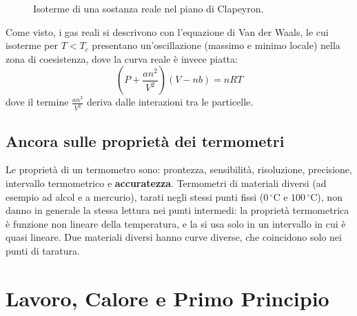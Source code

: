 \documentclass[11pt, a4paper, openright]{book}
\theoremstyle{plain}
\theoremstyle{definition}
\theoremstyle{remark}
\begin{document}
\begin{figure}[H]
    \centering
    \caption{Isoterme di una sostanza reale nel piano di Clapeyron.}
\end{figure}

Come visto, i gas reali si descrivono con l'equazione di Van der Waals, le cui isoterme per $T < T_c$ presentano un'oscillazione (massimo e minimo locale) nella zona di coesistenza, dove la curva reale è invece piatta:
\begin{equation}
    \left(P + \frac{an^2}{V^2}\right)\left(V - nb\right) = nRT
\end{equation}
dove il termine $\frac{an^2}{V^2}$ deriva dalle interazioni tra le particelle.

\section{Ancora sulle proprietà dei termometri}
Le proprietà di un termometro sono: prontezza, sensibilità, risoluzione, precisione, intervallo termometrico e \textbf{accuratezza}. Termometri di materiali diversi (ad esempio ad alcol e a mercurio), tarati negli stessi punti fissi ($0\,^\circ\text{C}$ e $100\,^\circ\text{C}$), non danno in generale la stessa lettura nei punti intermedi: la proprietà termometrica è funzione non lineare della temperatura, e la si usa solo in un intervallo in cui è quasi lineare. Due materiali diversi hanno curve diverse, che coincidono solo nei punti di taratura.

\chapter{Lavoro, Calore e Primo Principio}
\end{document}
